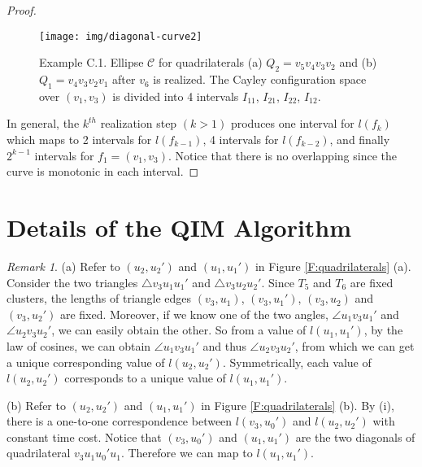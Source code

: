 \documentclass[secthm,amsthm,english]{article}
\theoremstyle{definition}
\theoremstyle{remark}
\newtheorem{remark}{Remark}
\begin{document}
\begin{proof}
\begin{figure}[h]
	  
	 
	
	 
	 
	
	\begin{centering}
	\texttt{[image: img/diagonal-curve2]} 
	\par\end{centering}
	
	\caption{Example C.1. Ellipse $\mathcal{C}$ for quadrilaterals (a) $Q_2 = v_{5}v_{4}v_{3}v_{2}$
	and (b) $Q_1 = v_{4}v_{3}v_{2}v_{1}$ after $v_{6}$ is realized. 
	The Cayley configuration space over $(v_1,v_3)$ is divided into 4 intervals $I_{11}$,
	$I_{21}$, $I_{22}$, $I_{12}$. }

\label{F:diagonal-curve-2} 
\end{figure}


In general, the $k^{th}$ realization step  $(k > 1)$ produces one interval for $l(f_k)$
which maps to 2 intervals for $l(f_{k-1})$, 4 intervals for $l(f_{k-2})$, and finally
$2^{k-1}$ intervals for $f_{1}=(v_{1},v_{3})$. 
Notice that there is no overlapping since 
the curve is monotonic in each interval.
\end{proof}









\section{Details of the QIM Algorithm}
\label{app:qim}

\begin{remark}
\label{rmk:qim}
(a) Refer to $(u_2,u_2')$ and $(u_1,u_1')$ in Figure \ref{F:quadrilaterals} (a). 
Consider the two triangles $\triangle v_3u_1u_1'$ and $\triangle v_3u_2u_2'$. 
Since $T_5$ and $T_6$ are fixed clusters, the lengths of triangle edges $(v_3,u_1)$, $(v_3,u_1')$, $(v_3,u_2)$ and $(v_3,u_2')$ are fixed. 
Moreover, if we know one of the two angles, $\angle u_1v_3u_1'$ and $\angle u_2v_3u_2'$, we can easily obtain the other. 
So from a value of $l(u_1,u_1')$, by the law of cosines, we can obtain $\angle u_1v_3u_1'$ and thus $\angle u_2v_3u_2'$, from which we can get a unique corresponding value of $l(u_2,u_2')$. Symmetrically, each value of $l(u_2,u_2')$ corresponds to a unique value of $l(u_1,u_1')$. 


\noindent(b) Refer to $(u_2,u_2')$ and $(u_1,u_1')$ in Figure \ref{F:quadrilaterals} (b). 
By (i), there is a one-to-one correspondence between $l(v_3,u_0')$ and $l(u_2,u_2')$ with constant time cost. 
Notice that $(v_3,u_0')$ and $(u_1,u_1')$ are the two diagonals of quadrilateral $v_3u_1u_0'u_1$. 
Therefore we can map to $l(u_1,u_1')$. 
\end{remark}
\end{document}
